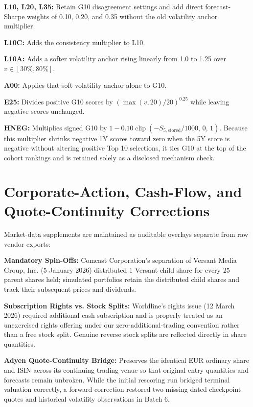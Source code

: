 \documentclass[11pt,a4paper]{article}
\numberwithin{table}{section}
\begin{document}
\textbf{L10, L20, L35:}  Retain G10 disagreement settings and add direct forecast-Sharpe weights of 0.10, 0.20, and 0.35 without the old volatility anchor multiplier.

\textbf{L10C:}  Adds the consistency multiplier to L10.

\textbf{L10A:}  Adds a softer volatility anchor rising linearly from 1.0 to 1.25 over $v \in [30\%, 80\%]$.

\textbf{A00:}  Applies that soft volatility anchor alone to G10.

\textbf{E25:}  Divides positive G10 scores by $(\max(v, 20) / 20)^{0.25}$ while leaving negative scores unchanged.

\textbf{HNEG:}  Multiplies signed G10 by $1 - 0.10\operatorname{clip}(-S_{5,\text{stored}} / 1000,\, 0,\, 1)$. Because this multiplier shrinks negative 1Y scores toward zero when the 5Y score is negative without altering positive Top 10 selections, it ties G10 at the top of the cohort rankings and is retained solely as a disclosed mechanism check.

\section{Corporate-Action, Cash-Flow, and Quote-Continuity Corrections}

Market-data supplements are maintained as auditable overlays separate from raw vendor exports:

\textbf{Mandatory Spin-Offs:}  Comcast Corporation's separation of Versant Media Group, Inc. (5 January 2026) distributed 1 Versant child share for every 25 parent shares held; simulated portfolios retain the distributed child shares and track their subsequent prices and dividends.

\textbf{Subscription Rights vs. Stock Splits:}  Worldline's rights issue (12 March 2026) required additional cash subscription and is properly treated as an unexercised rights offering under our zero-additional-trading convention rather than a free stock split. Genuine reverse stock splits are reflected directly in share quantities.

\textbf{Adyen Quote-Continuity Bridge:}  Preserves the identical EUR ordinary share and ISIN across its continuing trading venue so that original entry quantities and forecasts remain unbroken. While the initial rescoring run bridged terminal valuation correctly, a forward correction restored two missing dated checkpoint quotes and historical volatility observations in Batch 6.
\end{document}
